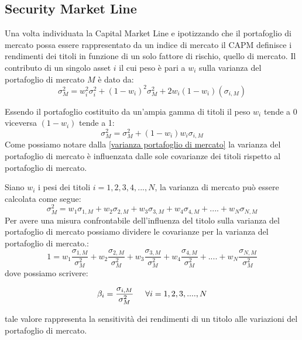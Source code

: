 \subsection{Security Market Line}

Una volta individuata la Capital Market Line e ipotizzando che il portafoglio di mercato possa essere rappresentato da un indice di mercato il CAPM definisce i rendimenti dei titoli in funzione di un solo fattore di rischio, quello di mercato. 
Il contributo di un singolo asset $i$ il cui peso è pari a $w_i$ sulla varianza del portafoglio di mercato $M$ è dato da:
\begin{equation}
\sigma^{2}_{M}= w^2_{i}\sigma^{2}_{i}+ (1-w_{i})^2\sigma^{2}_{M}+ 2 w_{i}(1-w_{i})(\sigma_{i,M})
\end{equation}

Essendo il portafoglio costituito da un'ampia gamma di titoli il peso $w_{i}$ tende a 0 viceversa $(1-w_{i})$ tende a 1: 
\begin{equation}
\label{varianza portafoglio di mercato}
\sigma^{2}_{M}= \sigma^{2}_{M}+(1-w_{i}) w_{i}\sigma_{i,M}
\end{equation}
Come possiamo notare dalla \ref{varianza portafoglio di mercato} la varianza del portafoglio di mercato è influenzata dalle sole covarianze dei titoli rispetto al portafoglio di mercato. 

Siano $w_i$ i pesi dei titoli $i=1,2,3,4,...,N$, la varianza di mercato può essere calcolata come segue:
\begin{equation}
\sigma^{2}_{M}= w_{1}\sigma_{1,M}+w_{2}\sigma_{2,M}+w_{3}\sigma_{3,M}+w_{4}\sigma_{4,M} +....+ w_{N}\sigma_{N,M}
\end{equation}
Per avere una misura confrontabile dell'influenza del titolo sulla varianza del portafoglio di mercato possiamo dividere le covarianze per la varianza del portafoglio di mercato.:
\begin{equation}
1=w_{1}\frac{\sigma_{1,M}}{\sigma^{2}_{M}}+w_{2}\frac{\sigma_{2,M}}{\sigma^{2}_{M}}+w_{3}\frac{\sigma_{3,M}}{\sigma^{2}_{M}}+w_{4}\frac{\sigma_{4,M}}{\sigma^{2}_{M}} +....+ w_{N}\frac{\sigma_{N,M}}{\sigma^{2}_{M}}
\end{equation}
dove possiamo scrivere:

\begin{equation}
\beta_i= \frac{\sigma_{i,M}}{\sigma^{2}_{M}} \hspace{0,5cm} \forall i={1,2,3,....,N} 
\end{equation}

tale valore rappresenta la sensitività dei rendimenti di un titolo alle variazioni del portafoglio di mercato. 

